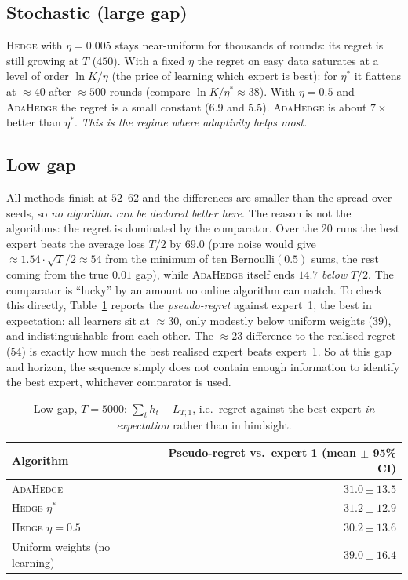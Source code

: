 \documentclass[11pt,a4paper]{article}
\newcommand{\Hedge}{\textsc{Hedge}}
\newcommand{\Ada}{\textsc{AdaHedge}}
\newcommand{\lnK}{\ln K}
\begin{document}
\subsection{Stochastic (large gap)}
\Hedge{} with $\eta=0.005$ stays near-uniform for thousands of rounds: its regret is still growing at $T$ ($450$). With a fixed $\eta$ the regret on easy data saturates at a level of order $\lnK/\eta$ (the price of learning which expert is best):
for $\eta^*$ it flattens at $\approx40$ after $\approx500$ rounds (compare $\lnK/\eta^*\approx38$). With $\eta=0.5$ and \Ada{} the regret is a small constant ($6.9$ and $5.5$).
\Ada{} is about $7\times$ better than $\eta^*$. \emph{This is the regime where adaptivity helps most.}

\subsection{Low gap}
All methods finish at $52$--$62$ and the differences are smaller than the spread over seeds, so \emph{no algorithm can be declared better here}.
The reason is not the algorithms: the regret is dominated by the comparator. Over the 20 runs the best expert beats the average loss $T/2$
by $69.0$ (pure noise would give $\approx1.54\cdot\sqrt T/2\approx54$ from the minimum of ten Bernoulli$(0.5)$ sums, the rest coming from the true $0.01$ gap), while \Ada{} itself ends $14.7$ \emph{below} $T/2$.
The comparator is ``lucky'' by an amount no online algorithm can match.
To check this directly, Table~\ref{tab:pseudo} reports the \emph{pseudo-regret} against expert~1, the best in expectation: all learners sit at $\approx30$, only modestly below uniform weights ($39$), and indistinguishable from each other. The $\approx23$ difference to the realised regret ($54$) is exactly how much the best realised expert beats expert~1.
So at this gap and horizon, the sequence simply does not contain enough information to identify the best expert, whichever comparator is used.

\begin{table}[t]
\centering\small
\begin{tabular}{lr}
\toprule
Algorithm & Pseudo-regret vs.\ expert 1 (mean $\pm$ 95\% CI)\\
\midrule
\Ada{} & $31.0\pm13.5$ \\
\Hedge{} $\eta^*$ & $31.2\pm12.9$ \\
\Hedge{} $\eta=0.5$ & $30.2\pm13.6$ \\
Uniform weights (no learning) & $39.0\pm16.4$\\
\bottomrule
\end{tabular}
\caption{Low gap, $T=5000$: $\sum_t h_t-L_{T,1}$, i.e.\ regret against the best expert \emph{in expectation} rather than in hindsight.}
\label{tab:pseudo}
\end{table}
\end{document}
